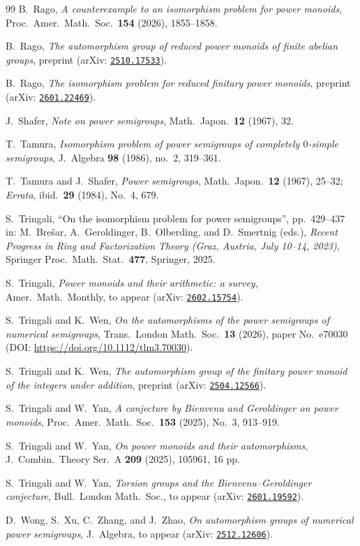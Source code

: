 \documentclass[11pt,reqno]{amsart}
\theoremstyle{definition}
\theoremstyle{remark}
\theoremstyle{theoremdd}
\renewcommand{\,}{\kern 0.1em}
\begin{document}
\begin{thebibliography}{99}
 B.~Rago, \textit{A counterexample to an isomorphism problem for power monoids}, Proc.\ Amer.\ Math.\ Soc.\ \textbf{154} (2026), 1855--1858.

 B.~Rago, \textit{The automorphism group of reduced power monoids of finite abelian groups}, preprint (arXiv: \href{https://arxiv.org/abs/2510.17533}{\tt 2510.17533}).

 B.~Rago, \textit{The isomorphism problem for reduced finitary power monoids}, preprint (arXiv: \href{https://arxiv.org/abs/2601.22469}{\tt 2601.22469}).

 J.~Shafer, \textit{Note on power semigroups}, Math.~Japon.~\textbf{12} (1967), 32.

T.~Tamura,
\textit{Isomorphism problem of power semigroups of completely $0$-simple semigroups},
J.~Algebra \textbf{98} (1986), no.~2, 319--361.

 T.~Tamura and J.~Shafer, \textit{Power semigroups}, Math.\ Japon.\ \textbf{12} (1967), 25--32; \textit{Errata},
ibid.\ \textbf{29} (1984), No.~4, 679.

 S.~Tringali, ``On the isomorphism problem for power semigroups'', pp.~429--437 in: M.~Bre\v{s}ar, A.~Geroldinger, B.~Olberding, and D.~Smertnig (eds.), \textit{Recent Progress in Ring and Factorization Theory (Graz, Austria, July 10–14, 2023)}, Springer Proc.~Math.~Stat.~\textbf{477}, Springer, 2025.

S.~Tringali, \textit{Power monoids and their arithmetic: a survey}, Amer.\ Math.\ Monthly, to appear (arXiv: \href{https://arxiv.org/abs/2602.15754}{\tt 2602.15754}).

 S.~Tringali and K.~Wen, \textit{On the automorphisms of the power semigroups of numerical semigroups}, Trans.\ London Math.\ Soc.~\textbf{13} (2026), paper No.~e70030 (DOI: \url{https://doi.org/10.1112/tlm3.70030}).

 S.~Tringali and K.~Wen, \textit{The automorphism group of the finitary power monoid of the integers under addition}, preprint (arXiv: \href{https://arxiv.org/abs/2504.12566}{\tt 2504.12566}).

 S.~Tringali and W.~Yan, \textit{A conjecture by Bienvenu and Geroldinger on power monoids}, Proc.\ Amer.\ Math.\ Soc.\ \textbf{153} (2025), No.~3, 913--919.

 S.~Tringali and W.~Yan, \textit{On power monoids and their automorphisms}, J.\ Combin.\ Theory Ser.\ A \textbf{209} (2025), 105961, 16 pp.

 S.~Tringali and W.~Yan, \textit{Torsion groups and the Bienvenu--Geroldinger conjecture}, Bull.\ London Math.\ Soc., to appear (arXiv: \href{https://arxiv.org/abs/2601.19592}{\tt 2601.19592}).

 D.~Wong, S.~Xu, C.~Zhang, and J.~Zhao, \textit{On automorphism groups of numerical power semigroups}, J.\ Algebra, to appear (arXiv: \href{https://arxiv.org/abs/2512.12606}{\tt 2512.12606}).

\end{thebibliography}
\end{document}
